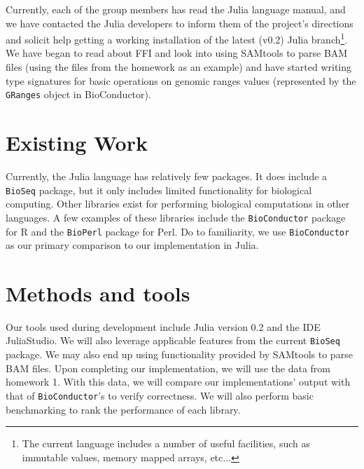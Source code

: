 \documentclass[10pt]{article}
\begin{document}
Currently, each of the group members has read the Julia language manual, and we have contacted 
the Julia developers to inform them of the project's directions and solicit help getting a working installation 
of the latest (v0.2) Julia branch\footnote{The current language includes a number of useful facilities, such as 
immutable values, memory mapped arrays, etc...}.  We have began to read about FFI and look into using 
SAMtools to parse BAM files (using the files from the homework as an example) and have started writing 
type signatures for basic operations on genomic ranges values (represented by the \texttt{GRanges} object 
in BioConductor).

\section{Existing Work}

Currently, the Julia language has relatively few packages.  It does
include a \texttt{BioSeq} \cite{bioseq} package, but it
only includes limited functionality for biological computing.  
Other libraries exist for performing biological computations in other languages.
A few examples of these libraries include the \texttt{BioConductor} \cite{bioseq} package for R and the \texttt{BioPerl} \cite{bioperl}  package for Perl. Do to familiarity, we use \texttt{BioConductor} as our primary comparison to our implementation in Julia.


\section{Methods and tools}

Our tools used during development include Julia version 0.2 and the IDE JuliaStudio. We will also leverage applicable features from the current \texttt{BioSeq} package. We may also end up using functionality provided by SAMtools to parse BAM files.
Upon completing our implementation, we will use the data from homework 1. With this data, we will compare our implementations' output with that of \texttt{BioConductor}'s to verify correctness. We will also perform basic benchmarking to rank the performance of each library.
\end{document}

